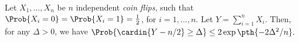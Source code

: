 \begin {corollary} Let $X_1, \ldots , X_n$ be $n$ independent \emph {coin flips}, such that $\Prob {X_i =0} =\Prob {X_i=1} = \frac {1}{2}$, for $i=1,\ldots , n$. Let $Y = \sum _{i=1}^n X_i$. Then, for any $\Delta >0$, we have \begin {math} \Prob {\cardin {Y - {n}/{2}} \geq \Delta }\leq 2\exp \pth {-2\Delta ^2/n}. \end {math} \end {corollary}
